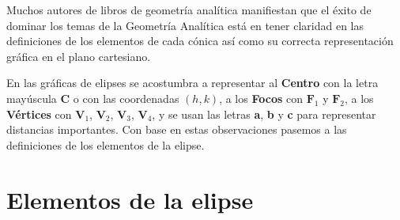 \documentclass[12pt,a4paper]{article}
\begin{document}
	\bigskip

	Muchos autores de libros de geometría analítica manifiestan que el éxito de dominar los temas de la Geometría Analítica está en tener claridad en las definiciones de los elementos de cada cónica así como su correcta representación gráfica en el plano cartesiano.

	\bigskip

	En las gráficas de elipses se acostumbra a representar al \textbf{Centro} con la letra mayúscula \textbf{C} o con las coordenadas \textbf{$(h,k)$}, a los \textbf{Focos} con $\textbf{F}_1$ y $\textbf{F}_2$, a los \textbf{Vértices} con $\textbf{V}_1$, $\textbf{V}_2$, $\textbf{V}_3$, $\textbf{V}_4$, y se usan las letras \textbf{a}, \textbf{b} y \textbf{c} para representar distancias importantes. Con base en estas observaciones pasemos a las definiciones de los elementos de la elipse.

	\section{Elementos de la elipse}
\end{document}
